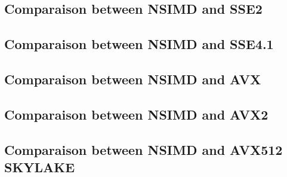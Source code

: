 \subsection{Comparaison between NSIMD and SSE2}
\subsection{Comparaison between NSIMD and SSE4.1}
\subsection{Comparaison between NSIMD and AVX}
\subsection{Comparaison between NSIMD and AVX2}
\subsection{Comparaison between NSIMD and AVX512 SKYLAKE}







